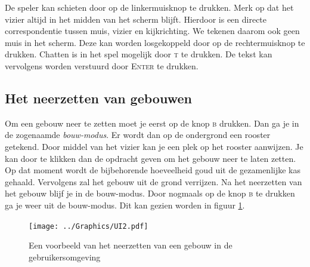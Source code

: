     De speler kan schieten door op de linkermuisknop te drukken. Merk op dat het vizier altijd in het midden van het scherm blijft. Hierdoor is een directe correspondentie tussen muis, vizier en kijkrichting. We tekenen daarom ook geen muis in het scherm. Deze kan worden losgekoppeld door op de rechtermuisknop te drukken. Chatten is in het spel mogelijk door \textsc{t} te drukken. De tekst kan vervolgens worden verstuurd door \textsc{Enter} te drukken.

    \subsection{Het neerzetten van gebouwen}
    Om een gebouw neer te zetten moet je eerst op de knop \textsc{b} drukken. Dan ga je in de zogenaamde \emph{bouw-modus}. Er wordt dan op de ondergrond een rooster getekend. Door middel van het vizier kan je een plek op het rooster aanwijzen. Je kan door te klikken dan de opdracht geven om het gebouw neer te laten zetten. Op dat moment wordt de bijbehorende hoeveelheid goud uit de gezamenlijke kas gehaald. Vervolgens zal het gebouw uit de grond verrijzen. Na het neerzetten van het gebouw blijf je in de bouw-modus. Door nogmaals op de knop \textsc{b} te drukken ga je weer uit de bouw-modus. Dit kan gezien worden in figuur \ref{fig:gebouw}.

    \begin{figure}
    \centering
    \texttt{[image: ../Graphics/UI2.pdf]}
    \caption{Een voorbeeld van het neerzetten van een gebouw in de gebruikersomgeving}
    \label{fig:gebouw}
    \end{figure} 